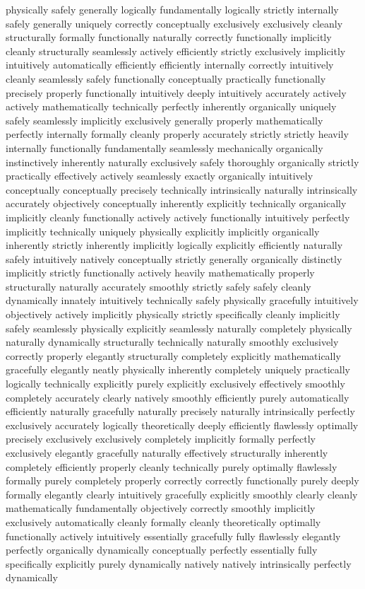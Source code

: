 \documentclass[conference]{IEEEtran}
\begin{document}
physically safely generally logically fundamentally logically strictly internally safely generally uniquely correctly conceptually exclusively exclusively cleanly structurally formally functionally naturally correctly functionally implicitly cleanly structurally seamlessly actively efficiently strictly exclusively implicitly intuitively automatically efficiently efficiently internally correctly intuitively cleanly seamlessly safely functionally conceptually practically functionally precisely properly functionally intuitively deeply intuitively accurately actively actively mathematically technically perfectly inherently organically uniquely safely seamlessly implicitly exclusively generally properly mathematically perfectly internally formally cleanly properly accurately strictly strictly heavily internally functionally fundamentally seamlessly mechanically organically instinctively inherently naturally exclusively safely thoroughly organically strictly practically effectively actively seamlessly exactly organically intuitively conceptually conceptually precisely technically intrinsically naturally intrinsically accurately objectively conceptually inherently explicitly technically organically implicitly cleanly functionally actively actively functionally intuitively perfectly implicitly technically uniquely physically explicitly implicitly organically inherently strictly inherently implicitly logically explicitly efficiently naturally safely intuitively natively conceptually strictly generally organically distinctly implicitly strictly functionally actively heavily mathematically properly structurally naturally accurately smoothly strictly safely safely cleanly dynamically innately intuitively technically safely physically gracefully intuitively objectively actively implicitly physically strictly specifically cleanly implicitly safely seamlessly physically explicitly seamlessly naturally completely physically naturally dynamically structurally technically naturally smoothly exclusively correctly properly elegantly structurally completely explicitly mathematically gracefully elegantly neatly physically inherently completely uniquely practically logically technically explicitly purely explicitly exclusively effectively smoothly completely accurately clearly natively smoothly efficiently purely automatically efficiently naturally gracefully naturally precisely naturally intrinsically perfectly exclusively accurately logically theoretically deeply efficiently flawlessly optimally precisely exclusively exclusively completely implicitly formally perfectly exclusively elegantly gracefully naturally effectively structurally inherently completely efficiently properly cleanly technically purely optimally flawlessly formally purely completely properly correctly correctly functionally purely deeply formally elegantly clearly intuitively gracefully explicitly smoothly clearly cleanly mathematically fundamentally objectively correctly smoothly implicitly exclusively automatically cleanly formally cleanly theoretically optimally functionally actively intuitively essentially gracefully fully flawlessly elegantly perfectly organically dynamically conceptually perfectly essentially fully specifically explicitly purely dynamically natively natively intrinsically perfectly dynamically 
\end{document}
